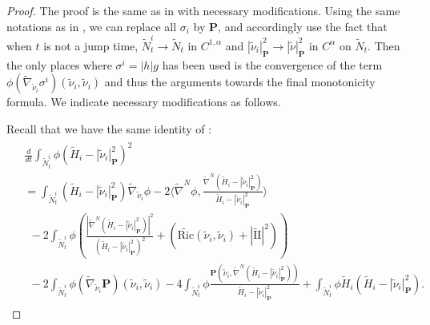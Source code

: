 \documentclass[11pt,letterpaper]{amsart}
\theoremstyle{definition}
\theoremstyle{remark}
\begin{document}
\begin{proof}
	The proof is the same as in \cite[Section 6]{Dong26SigmaIMCF} with necessary modifications.
Using the same notations as in \cite[Section 6]{Dong26SigmaIMCF}, we can replace all $\sigma _i$ by $\mathbf{P}$, and accordingly use the fact that when $t$ is not a jump time, $\tilde{N}_t ^{i} \to \tilde{N}_t$ in $C^{1,\alpha }$ and $|\tilde{\nu }_i|^2_{\mathbf{P}} \to |\tilde{\nu }|^2_{\mathbf{P}}$ in $C^{\alpha }$ on $\tilde{N}_t$. Then the only places where $\sigma ^{i} = |h| g$ has been used is the convergence of the term $\phi (\tilde{\nabla }_{\tilde{\nu }_i} \sigma ^{i})(\tilde{\nu }_i, \tilde{\nu }_i)$ and thus the arguments towards the final monotonicity formula. We indicate necessary modifications as follows.


	Recall that we have the same identity of \cite[Equation (30)]{Dong26SigmaIMCF}:
\begin{align}\label{ddt-identity-i}
	\begin{split}
		&\frac{d}{d t} \int_{\tilde{N}^{i}_t} \phi (\tilde{H}_{i}- |\tilde{\nu}_{i} |^2_{\mathbf{P} })^2 \\							&= \int_{\tilde{N}^{i}_t} (\tilde{H}_{i}-|\tilde{\nu}_i |^2_{ \mathbf{P}}) \tilde{\nabla} _{\tilde{\nu}_i }\phi -2 \langle \tilde{\nabla} ^{N} \phi , \frac{\tilde{\nabla} ^{N}(\tilde{H}_i-|\tilde{\nu}_i |^2_{\mathbf{P}})}{\tilde{H}_i- |\tilde{\nu}_i |^2_{\mathbf{P} }} \rangle \\
		&\ \ - 2 \int_{\tilde{N}^{i}_t}\phi \left(   \frac{|\tilde{\nabla} ^{N} (\tilde{H}_i-|\tilde{\nu}_i |^2_{ \mathbf{P}})|^2}{(\tilde{H}_i-|\tilde{\nu}_i |^2_{\mathbf{P} })^2} + \left( \tilde{\mathrm{Ric}}(\tilde{\nu}_i ,\tilde{\nu}_i ) +|\tilde{\mathrm{II}}|^2 \right) \right) \\
		&\ \ -2 \int_{\tilde{N}^{i}_t} \phi (\tilde{\nabla} _{\tilde{\nu}_i } \mathbf{P}) (\tilde{\nu}_i , \tilde{\nu}_i ) - 4 \int_{\tilde{N}^i_t} \phi \frac{\mathbf{P}( \tilde{\nu}_i , \tilde{\nabla} ^{N}(\tilde{H}_i- |\tilde{\nu}_i |^2_{\mathbf{P} }) )}{\tilde{H}_i- |\tilde{\nu}_i |^2_{\mathbf{P}}} + \int_{\tilde{N}^{i}_t}\phi \tilde{H}_i(\tilde{H}_i-|\tilde{\nu}_i |^2_{\mathbf{P} }).
	\end{split}
\end{align}


\end{proof}
\end{document}
